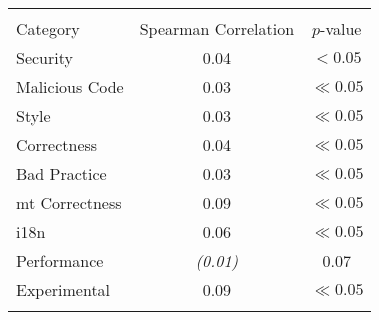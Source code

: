 
\begin{tabular}{lcc}
\hline \\
Category & Spearman Correlation & $p$-value \\ \hline 
Security & 0.04 & $< 0.05$\\
Malicious Code & 0.03 & $\ll 0.05$\\
Style & 0.03 & $\ll 0.05$\\
Correctness & 0.04 & $\ll 0.05$\\
Bad Practice & 0.03 & $\ll 0.05$\\
{\sc mt} Correctness & 0.09 & $\ll 0.05$\\
i18n & 0.06 & $\ll 0.05$\\
Performance & {\it (0.01) } & 0.07\\
Experimental & 0.09 & $\ll 0.05$\\
\hline \\
\end{tabular}
